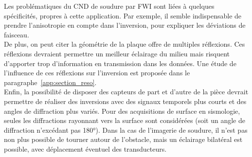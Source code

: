 Les problématiques du CND de soudure par FWI sont liées à quelques spécificités, propres à cette application. Par exemple, il semble indispensable de prendre l'anisotropie en compte dans l'inversion, pour expliquer les déviations de faisceau.\\

De plus, on peut citer la géométrie de la plaque offre de multiples réflexions. Ces réflexions devraient permettre un meilleur éclairage du milieu mais risquent d'apporter trop d'information en transmission dans les données. Une étude de l'influence de ces réflexions sur l'inversion est proposée dans le paragraphe~\ref{app:section_reso}. \\

Enfin, la possibilité de disposer des capteurs de part et d'autre de la pièce devrait permettre de réaliser des inversions avec des signaux temporels plus courts et des angles de diffraction plus variés. Pour des acquisitions de surface en sismologie, seules les diffractions rayonnant vers la surface sont considérées (soit un angle de diffraction n'excédant pas 180°). Dans la cas de l'imagerie de soudure, il n'est pas non plus possible de tourner autour de l'obstacle, mais un éclairage bilatéral est possible, avec déplacement éventuel des transducteurs.


%








%
%
%
